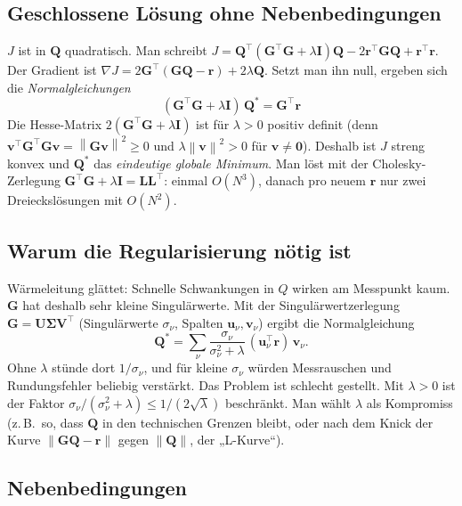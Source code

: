 \documentclass[11pt,a4paper]{article}
\numberwithin{equation}{section}
\newcommand{\mI}{\mathbf{I}}
\newcommand{\mG}{\mathbf{G}}
\newcommand{\vQ}{\mathbf{Q}}
\newcommand{\vr}{\mathbf{r}}
\newcommand{\vv}{\mathbf{v}}
\newcommand{\norm}[1]{\left\lVert #1\right\rVert}
\begin{document}
\subsection{Geschlossene Lösung ohne Nebenbedingungen}

$J$ ist in $\vQ$ quadratisch. Man schreibt $J=\vQ^\top(\mG^\top\mG+\lambda\mI)\vQ-2\vr^\top\mG\vQ+\vr^\top\vr$. Der Gradient ist $\nabla J=2\mG^\top(\mG\vQ-\vr)+2\lambda\vQ$. Setzt man ihn null, ergeben sich die \emph{Normalgleichungen}
\begin{equation}
 \boxed{\;(\mG^\top\mG+\lambda\mI)\,\vQ^\ast=\mG^\top\vr\;}
\end{equation}
Die Hesse-Matrix $2(\mG^\top\mG+\lambda\mI)$ ist für $\lambda>0$ positiv definit (denn $\vv^\top\mG^\top\mG\vv=\norm{\mG\vv}^2\ge0$ und $\lambda\norm{\vv}^2>0$ für $\vv\ne\mathbf0$). Deshalb ist $J$ streng konvex und $\vQ^\ast$ das \emph{eindeutige globale Minimum}. Man löst mit der Cholesky-Zerlegung $\mG^\top\mG+\lambda\mI=\mathbf L\mathbf L^\top$: einmal $O(N^3)$, danach pro neuem $\vr$ nur zwei Dreieckslösungen mit $O(N^2)$.

\subsection{Warum die Regularisierung nötig ist}

Wärmeleitung glättet: Schnelle Schwankungen in $Q$ wirken am Messpunkt kaum. $\mG$ hat deshalb sehr kleine Singulärwerte. Mit der Singulärwertzerlegung $\mG=\mathbf U\symbf{\Sigma}\mathbf V^\top$ (Singulärwerte $\sigma_\nu$, Spalten $\mathbf u_\nu,\mathbf v_\nu$) ergibt die Normalgleichung
\begin{equation}
 \vQ^\ast=\sum_\nu\frac{\sigma_\nu}{\sigma_\nu^2+\lambda}\,(\mathbf u_\nu^\top\vr)\,\mathbf v_\nu .
\end{equation}
Ohne $\lambda$ stünde dort $1/\sigma_\nu$, und für kleine $\sigma_\nu$ würden Messrauschen und Rundungsfehler beliebig verstärkt. Das Problem ist schlecht gestellt. Mit $\lambda>0$ ist der Faktor $\sigma_\nu/(\sigma_\nu^2+\lambda)\le1/(2\sqrt\lambda)$ beschränkt. Man wählt $\lambda$ als Kompromiss (z.\,B.\ so, dass $\vQ$ in den technischen Grenzen bleibt, oder nach dem Knick der Kurve $\norm{\mG\vQ-\vr}$ gegen $\norm{\vQ}$, der „L-Kurve“).

\subsection{Nebenbedingungen}
\end{document}
